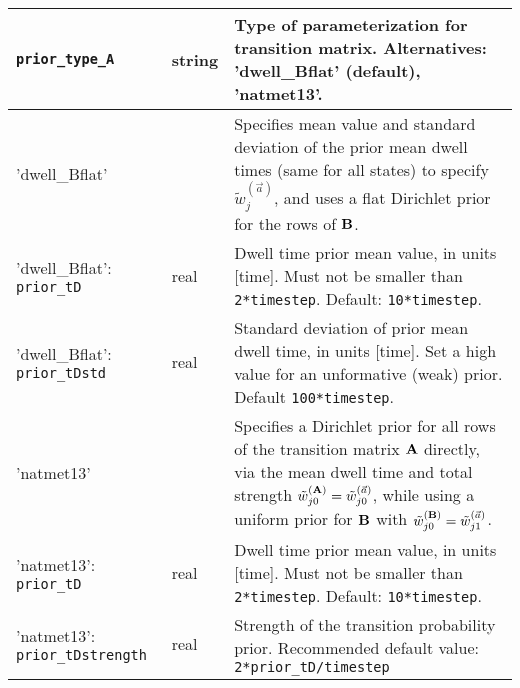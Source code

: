\begin{longtable}{|m{}|>{\centering\arraybackslash}m{}|m{}|}
\hline\hline

\texttt{prior\_type\_A}& string & Type of parameterization for
transition matrix. Alternatives: 'dwell\_Bflat' (default),
'natmet13'.\\ [0.5 ex] \hline

'dwell\_Bflat' & & Specifies mean value and standard deviation of the
prior mean dwell times (same for all states) to specify $\tilde
w_j^{(\vec{a})}$, and uses a flat Dirichlet prior for the rows of
$\mathbf{B}$. \\ [0.5ex] \hline

'dwell\_Bflat': \texttt{prior\_tD} & real & Dwell time
prior mean value, in units [time]. Must not be smaller than
\texttt{2*timestep}. Default: \texttt{10*timestep}. \\ [0.5ex] \hline

'dwell\_Bflat': \texttt{prior\_tDstd} & real& Standard deviation of
prior mean dwell time, in units [time]. Set a high value for an
unformative (weak) prior. Default \texttt{100*timestep}.
\\ [0.5ex] \hline

'natmet13' & & Specifies a Dirichlet prior for all rows of the
transition matrix $\mathbf{A}$ directly, via the mean dwell time and
total strength $\tilde w_{j0}^{(\mathbf{A})}=\tilde
w_{j0}^{(\vec{a})}$, while using a uniform prior for $\mathbf{B}$ with
$\tilde w_{j0}^{(\mathbf{B})}=\tilde w_{j1}^{(\vec{a})}$.  \\ [0.5ex]
\hline


'natmet13': \texttt{prior\_tD} & real & Dwell time
prior mean value, in units [time]. Must not be smaller than
\texttt{2*timestep}. Default: \texttt{10*timestep}. \\ [0.5ex] \hline

'natmet13': \texttt{prior\_tDstrength} & real & Strength of the transition
probability prior. Recommended default value:
\texttt{2*prior\_tD/timestep}\\ [1ex] %
\end{longtable}

\newpage

